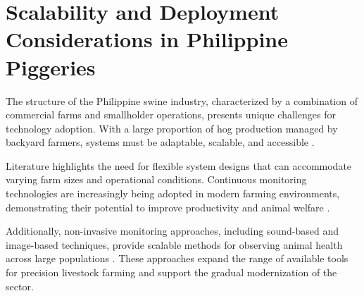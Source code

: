 \section{Scalability and Deployment Considerations in Philippine Piggeries}

The structure of the Philippine swine industry, characterized by a combination of commercial farms and smallholder operations, presents unique challenges for technology adoption. With a large proportion of hog production managed by backyard farmers, systems must be adaptable, scalable, and accessible \cite{lo2025rebooting}.

Literature highlights the need for flexible system designs that can accommodate varying farm sizes and operational conditions. Continuous monitoring technologies are increasingly being adopted in modern farming environments, demonstrating their potential to improve productivity and animal welfare \cite{lo2025rebooting, livestockproduction2026}.

Additionally, non-invasive monitoring approaches, including sound-based and image-based techniques, provide scalable methods for observing animal health across large populations \cite{reza2025review, dingcong2017monitoring}. These approaches expand the range of available tools for precision livestock farming and support the gradual modernization of the sector.
